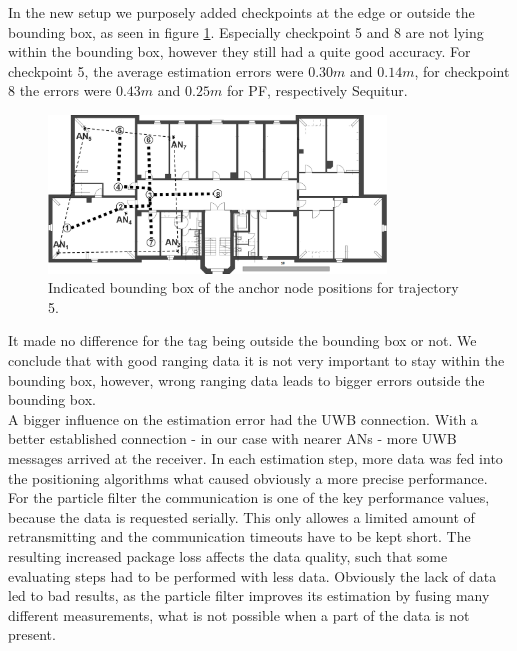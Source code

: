 In the new setup we purposely added checkpoints at the edge or outside the bounding box, as seen in figure \ref{fig:trajectory5_boundingBox}. Especially checkpoint 5 and 8 are not lying within the bounding box, however they still had a quite good accuracy. For checkpoint 5, the average estimation errors were $0.30m$ and $0.14m$, for checkpoint 8 the errors were $0.43m$ and $0.25m$ for PF, respectively Sequitur.
\begin{figure}[th]
\centering
\includegraphics[width=0.8\textwidth]{Figures/trajectory5_boundingBox}
\decoRule
\caption[Trajectory 5 with Bounding Box]{Indicated bounding box of the anchor node positions for trajectory 5.}
\label{fig:trajectory5_boundingBox}
\end{figure}
It made no difference for the tag being outside the bounding box or not. We conclude that with good ranging data it is not very important to stay within the bounding box, however, wrong ranging data leads to bigger errors outside the bounding box.\\
\noindent\hspace*{5mm}%
A bigger influence on the estimation error had the UWB connection. With a better established connection - in our case with nearer ANs - more UWB messages arrived at the receiver. In each estimation step, more data was fed into the positioning algorithms what caused obviously a more precise performance. For the particle filter the communication is one of the key performance values, because the data is requested serially. This only allowes a limited amount of retransmitting and the communication timeouts have to be kept short. The resulting increased package loss affects the data quality, such that some evaluating steps had to be performed with less data. Obviously the lack of data led to bad results, as the particle filter improves its estimation by fusing many different measurements, what is not possible when a part of the data is not present.